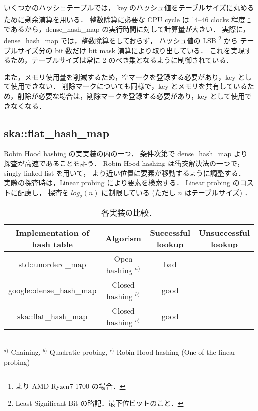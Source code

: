 いくつかのハッシュテーブルでは，
key のハッシュ値をテーブルサイズに丸めるために剰余演算を用いる．
整数除算に必要な CPU cycle は 14--46 clocks 程度
\footnote{
  \cite{AgnerFog2018}より AMD Ryzen7 1700 の場合．
}
であるから，dense\_hash\_map の実行時間に対して計算量が大きい．
実際に，
dense\_hash\_map では，整数除算をしておらず，
ハッシュ値の LSB \footnote{Least Significant Bit の略記．最下位ビットのこと．} から
テーブルサイズ分の bit 数だけ bit mask 演算により取り出している．
これを実現するため，テーブルサイズは常に 2 のべき乗となるように制御されている．

また，メモリ使用量を削減するため，空マークを登録する必要があり，key として使用できない．
削除マークについても同様で，key とメモリを共有しているため，削除が必要な場合は，削除マークを登録する必要があり，key として使用できなくなる．

\subsection{ska::flat\_hash\_map}

Robin Hood hashing の実実装の内の一つ．
条件次第で dense\_hash\_map より探査が高速であることを謳う．
Robin Hood hashing は衝突解決法の一つで，
singly linked list を用いて，
より近い位置に要素が移動するように調整する．
実際の探査時は，Linear probing により要素を検索する．
Linear probing のコストに配慮し，
探査を $log_2(n)$ に制限している (ただし $n$ はテーブルサイズ) \cite{Skarupke2017}．


\begin{table}[hbtp]
  \begin{center}
    \caption{各実装の比較．}
    \begin{tabular}{cccc} \hline
      Implementation of hash table & Algorism & Successful lookup & Unsuccessful lookup \\ \hline
      std::unorderd\_map           & Open hashing $^{a)}$ & bad & \\ 
      google::dense\_hash\_map     & Closed hashing $^{b)}$ & good& \\
      ska::flat\_hash\_map         & Closed hashing $^{c)}$ & good & \\ \hline
    \end{tabular}
    \\ \vspace{1.0mm}
    $^{a)}$ Chaining, 
    $^{b)}$ Quadratic probing,
    $^{c)}$ Robin Hood hashing (One of the linear probing)
    \\
  \end{center}
  \label{table_env}
\end{table}


